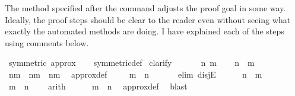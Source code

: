 \begin{isabellebody}
\begin{isamarkuptext}
The method specified after the command  adjusts the proof goal in some way. Ideally, the proof steps should be clear to the reader even without seeing what exactly the automated methods are doing. I have explained each of the steps using comments below.%
\end{isamarkuptext}\isamarkuptrue%
%
\isadelimvisible
%
\endisadelimvisible
%
\isatagvisible
{}\isamarkupfalse%
\ {\isacartoucheopen}symmetric\ approx{\isacartoucheclose}\isanewline
\ \ \isamarkupfalse%
\ symmetric{\isacharunderscore}{\kern0pt}def\isanewline
{}\isamarkupfalse%
\ {\isacharparenleft}{\kern0pt}clarify{\isacharparenright}{\kern0pt}\isanewline
\ \ %
\isanewline
\ \ \isamarkupfalse%
\ n\ m\isanewline
\ \ \isamarkupfalse%
\ {\isacartoucheopen}n\ {\isasymapprox}\ m{\isacartoucheclose}\isanewline
\ \ %
\isanewline
\ \ \isamarkupfalse%
\ {\isacartoucheopen}n{\isacharequal}{\kern0pt}m{\isacharminus}{\kern0pt}{}\ {\isasymor}\ n{\isacharequal}{\kern0pt}m\ {\isasymor}\ n{\isacharequal}{\kern0pt}m{\isacharplus}{\kern0pt}{}{\isacartoucheclose}\ \isamarkupfalse%
\ approx{\isacharunderscore}{\kern0pt}def\ \isacommand{{\isachardot}{\kern0pt}}\isamarkupfalse%
\isanewline
\ \ \isamarkupfalse%
\ {\isacartoucheopen}m\ {\isasymapprox}\ n{\isacartoucheclose}\isanewline
\ \ %
\isanewline
\ \ \isamarkupfalse%
\ {\isacharparenleft}{\kern0pt}elim\ disjE{\isacharparenright}{\kern0pt}\isanewline
\ \ \ \ \isamarkupfalse%
\ {\isacartoucheopen}n\ {\isacharequal}{\kern0pt}\ m\ {\isacharminus}{\kern0pt}\ {}{\isacartoucheclose}\isanewline
\ \ \ \ \isamarkupfalse%
\ {\isacartoucheopen}m\ {\isacharequal}{\kern0pt}\ n\ {\isacharplus}{\kern0pt}\ {}{\isacartoucheclose}\ \isamarkupfalse%
\ arith\isanewline
\ \ \ \ \isamarkupfalse%
\ {\isacartoucheopen}m\ {\isasymapprox}\ n{\isacartoucheclose}\ \isamarkupfalse%
\ approx{\isacharunderscore}{\kern0pt}def\ \isamarkupfalse%
\ blast\isanewline
\ \ \isamarkupfalse%
\isanewline
\ \ \ \ \isamarkupfalse%

\end{isabellebody}
